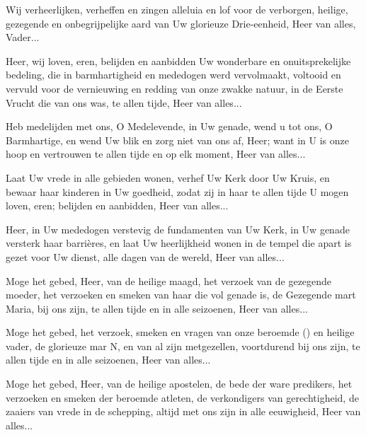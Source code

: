 \documentclass[12pt,twoside,a5paper]{article}
\begin{document}
\begin{halfparskip}
   Wij verheerlijken, verheffen en zingen alleluia en lof voor de verborgen, heilige,
  gezegende en onbegrijpelijke aard van Uw glorieuze Drie-eenheid, Heer van alles, Vader...
\end{halfparskip}

\begin{halfparskip}

   Heer, wij loven, eren, belijden en aanbidden Uw wonderbare en onuitsprekelijke bedeling, die in barmhartigheid en mededogen werd vervolmaakt, voltooid en vervuld voor de vernieuwing en redding van onze zwakke natuur, in de Eerste Vrucht die van ons was, te allen tijde, Heer van alles...

   Heb medelijden met ons, O Medelevende, in Uw genade, wend u tot ons, O Barmhartige, en wend Uw blik en zorg niet van ons af, Heer; want in U is onze hoop en vertrouwen te allen tijde en op elk moment, Heer van alles...

   Laat Uw vrede in alle gebieden wonen, verhef Uw Kerk door Uw Kruis, en bewaar haar kinderen in Uw goedheid, zodat zij in haar te allen tijde U mogen loven, eren; belijden en aanbidden, Heer van alles...

   Heer, in Uw mededogen verstevig de fundamenten van Uw Kerk, in Uw genade versterk haar barrières, en laat Uw heerlijkheid wonen in de tempel die apart is gezet voor Uw dienst, alle dagen van de wereld, Heer van alles...

   Moge het gebed, Heer, van de heilige maagd, het verzoek van de gezegende moeder, het verzoeken en smeken van haar die vol genade is, de Gezegende mart Maria, bij ons zijn, te allen tijde en in alle seizoenen, Heer van alles...

   Moge het gebed, het verzoek, smeken en vragen van onze beroemde () en heilige vader, de glorieuze mar N, en van al zijn metgezellen, voortdurend bij ons zijn, te allen tijde en in alle seizoenen, Heer van alles...

   Moge het gebed, Heer, van de heilige apostelen, de bede der ware predikers, het verzoeken en smeken der beroemde atleten, de verkondigers van gerechtigheid, de zaaiers van vrede in de schepping, altijd met ons zijn in alle eeuwigheid, Heer van alles...


\end{halfparskip}
\end{document}
